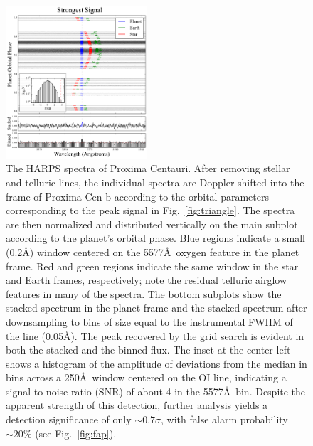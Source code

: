 \documentclass{emulateapj}
\begin{document}
\begin{figure}[bt]
\includegraphics[width=0.47\textwidth]{5577_strongest_river.pdf}
\caption{The HARPS spectra of Proxima Centauri. After removing stellar and telluric lines, the individual spectra are Doppler-shifted into the frame of Proxima Cen b according to the orbital parameters corresponding to the peak signal in Fig.~\ref{fig:triangle}. The spectra are then normalized and distributed vertically on the main subplot according to the planet's orbital phase. Blue regions indicate a small (0.2\AA) window centered on the 5577\AA\ oxygen feature in the planet frame. Red and green regions indicate the same window in the star and Earth frames, respectively; note the residual telluric airglow features in many of the spectra. The bottom subplots show the stacked spectrum in the planet frame and the stacked spectrum after downsampling to bins of size equal to the instrumental FWHM of the line (0.05\AA). The peak recovered by the grid search is evident in both the stacked and the binned flux. The inset at the center left shows a histogram of the amplitude of deviations from the median in bins across a 250\AA\ window centered on the OI line, indicating a signal-to-noise ratio (SNR) of about 4 in the 5577\AA\ bin. Despite the apparent strength of this detection, further analysis yields a detection significance of only ${\sim} 0.7\sigma$, with false alarm probability ${\sim} 20\%$ (see Fig.~\ref{fig:fap}).}
\label{fig:strongest_river}
\end{figure}
\end{document}
